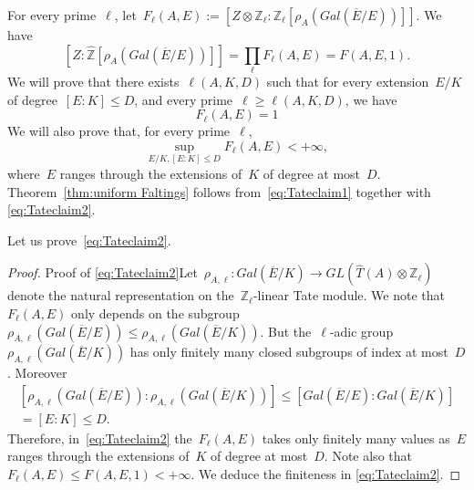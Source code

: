 \documentclass[12pt]{amsart}
\newcommand{\Z}{{\mathbb Z}}
\newcommand{\ol}{\overline}
\newcommand{\wh}{\widehat}
\newcommand{\tens}{\otimes}
\begin{document}
For every prime~$\ell$, let~$F_\ell(A,E):=\left[Z\tens\Z_\ell:\Z_\ell\left[\rho_A(Gal(\ol{E}/E))\right]\right]$. We have
\[
\left[Z:\wh{\Z}\left[\rho_A(Gal(\ol{E}/E))\right]\right]=\prod_\ell F_\ell(A,E)=F(A,E,1).
\]
We will prove that there exists~$\ell(A,K,D)$ such that for every extension~$E/K$ of degree~$[E:K]\leq D$,
and every prime~$\ell\geq \ell(A,K,D)$, we have
\begin{equation}\label{eq:Tateclaim1}
F_\ell(A,E)=1
\end{equation}
We will also prove that, for every prime~$\ell$,
\begin{equation}\label{eq:Tateclaim2}
\sup_{E/K, [E:K]\leq D}F_\ell(A,E)<+\infty,
\end{equation}
where~$E$ ranges through the extensions of~$K$ of degree at most~$D$. Theorem~\ref{thm:uniform Faltings} follows from~\eqref{eq:Tateclaim1} together with \eqref{eq:Tateclaim2}.


Let us prove~\eqref{eq:Tateclaim2}. 
\begin{proof}{Proof of \eqref{eq:Tateclaim2}}Let~$\rho_{A,\ell}:Gal(\ol{E}/K)\to GL(\widehat{T}(A)\tens\Z_\ell)$ denote the natural representation on the~$\Z_\ell$-linear Tate module. We note that~$F_\ell(A,E)$ only depends on the subgroup~$\rho_{A,\ell}(Gal(\ol{E}/E))\leq \rho_{A,\ell}(Gal(\ol{E}/K))$. But the~$\ell$-adic group~$\rho_{A,\ell}(Gal(\ol{E}/K))$ has only finitely many closed subgroups of index at most~$D$.  Moreover
\begin{multline*}
\left[\rho_{A,\ell}(Gal(\ol{E}/E)): \rho_{A,\ell}(Gal(\ol{E}/K))\right]\leq \left[Gal(\ol{E}/E): Gal(\ol{E}/K)\right]
\\=[E:K]\leq D.
\end{multline*}
Therefore, in~\eqref{eq:Tateclaim2} the~$F_\ell(A,E)$ takes only finitely many values as~$E$ ranges through the extensions of~$K$ of degree at most~$D$. Note also that~$F_\ell(A,E)\leq F(A,E,1)<+\infty$. We deduce the finiteness in \eqref{eq:Tateclaim2}.
\end{proof}
\end{document}
